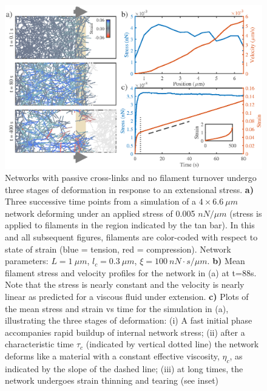 \documentclass[10pt,letterpaper]{article}
\begin{document}
\begin{figure}[h!]
\centering
\includegraphics[width=\hsize]{figures/figure2}
\caption{\label{fig:passive_ex}  Networks with passive cross-links and no filament turnover undergo three stages of deformation in response to an extensional stress.   \textbf{a)} Three successive time points from a simulation of a $4\times6.6\: \mu m$ network deforming under an applied stress of 0.005 $nN/\mu m$ (stress is applied to filaments in the region indicated by the tan bar). In this and all subsequent figures, filaments are color-coded with respect to state of strain (blue = tension, red = compression).  Network parameters: $L=1\: \mu m$, $l_c=0.3\: \mu m$, $\xi=100\: nN\cdot s/\mu m$. \textbf{b)} Mean filament stress and velocity profiles for the  network in (a) at t=88s. Note that the stress is nearly constant and the velocity is nearly linear as predicted for a viscous fluid under extension.  \textbf{c)} Plots of the mean stress and strain vs time for the simulation in (a), illustrating the three stages of deformation: (i) A fast initial phase accompanies rapid buildup of internal network stress; (ii) after a characteristic time $\tau_c$ (indicated by vertical dotted line) the network deforms like a material with a constant effective viscosity, $\eta_c$, as indicated by the slope of the dashed line; (iii) at long times, the network undergoes strain thinning and tearing (see inset)}
\end{figure}

\end{document}

